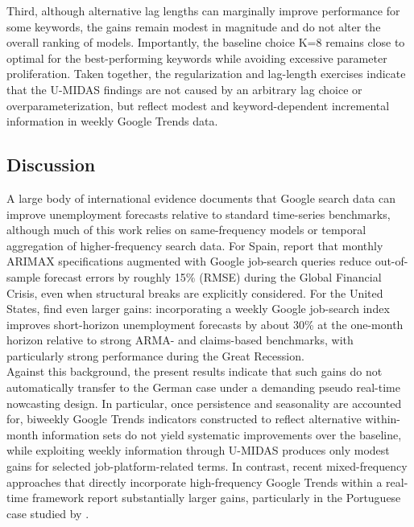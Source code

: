 \documentclass[12pt,a4paper]{article}
\begin{document}
Third, although alternative lag lengths can marginally improve performance for some keywords, the gains remain modest in magnitude and do not alter the overall ranking of models. Importantly, the baseline choice 
K=8 remains close to optimal for the best-performing keywords while avoiding excessive parameter proliferation. 
Taken together, the regularization and lag-length exercises indicate that the U-MIDAS findings are not caused by an arbitrary lag choice or overparameterization, but reflect modest and keyword-dependent incremental information in weekly Google Trends data.









\subsection{Discussion}
A large body of international evidence documents that Google search data can improve unemployment forecasts relative to standard time-series benchmarks, although much of this work relies on same-frequency models or temporal aggregation of higher-frequency search data. For Spain, \citet{vicente2015forecasting} report that monthly ARIMAX specifications augmented with Google job-search queries reduce out-of-sample forecast errors by roughly 15\% (RMSE) during the Global Financial Crisis, even when structural breaks are explicitly considered. For the United States, \citet{D'Amuri2010Google} find even larger gains: incorporating a weekly Google job-search index improves short-horizon unemployment forecasts by about 30\% at the one-month horizon relative to strong ARMA- and claims-based benchmarks, with particularly strong performance during the Great Recession.\\
Against this background, the present results indicate that such gains do not automatically transfer to the German case under a demanding pseudo real-time nowcasting design. In particular, once persistence and seasonality are accounted for, biweekly Google Trends indicators constructed to reflect alternative within-month information sets do not yield systematic improvements over the baseline, while exploiting weekly information through U-MIDAS produces only modest gains for selected job-platform-related terms. In contrast, recent mixed-frequency approaches that directly incorporate high-frequency Google Trends within a real-time framework report substantially larger gains, particularly in the Portuguese case studied by \citet{COSTA2024101963}.
\end{document}
